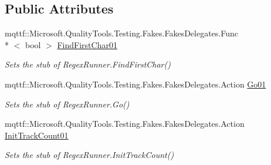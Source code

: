 \subsection*{Public Attributes}
\begin{DoxyCompactItemize}
\item 
mqttf\-::\-Microsoft.\-Quality\-Tools.\-Testing.\-Fakes.\-Fakes\-Delegates.\-Func\\*
$<$ bool $>$ \hyperlink{class_system_1_1_text_1_1_regular_expressions_1_1_fakes_1_1_stub_regex_runner_a30663cde01086cf903ddcc500ed24b9d}{Find\-First\-Char01}
\begin{DoxyCompactList}\small\item\em Sets the stub of Regex\-Runner.\-Find\-First\-Char()\end{DoxyCompactList}\item 
mqttf\-::\-Microsoft.\-Quality\-Tools.\-Testing.\-Fakes.\-Fakes\-Delegates.\-Action \hyperlink{class_system_1_1_text_1_1_regular_expressions_1_1_fakes_1_1_stub_regex_runner_aa82a7ae27ae72a950d91e1bcfb4cadc9}{Go01}
\begin{DoxyCompactList}\small\item\em Sets the stub of Regex\-Runner.\-Go()\end{DoxyCompactList}\item 
mqttf\-::\-Microsoft.\-Quality\-Tools.\-Testing.\-Fakes.\-Fakes\-Delegates.\-Action \hyperlink{class_system_1_1_text_1_1_regular_expressions_1_1_fakes_1_1_stub_regex_runner_a7ee6c3f145dff046c0d2a33f38f2eca4}{Init\-Track\-Count01}
\begin{DoxyCompactList}\small\item\em Sets the stub of Regex\-Runner.\-Init\-Track\-Count()\end{DoxyCompactList}\end{DoxyCompactItemize}
